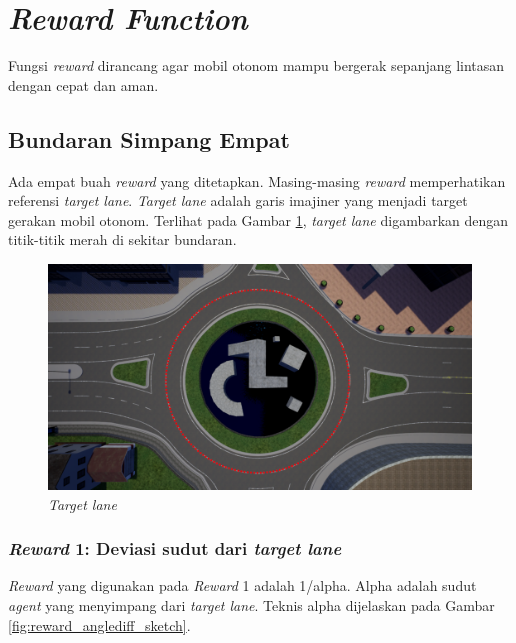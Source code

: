 \section{\textit{Reward Function}}
\label{sec:sistem_reward}

Fungsi \textit{reward} dirancang agar mobil otonom mampu bergerak sepanjang lintasan dengan cepat dan aman.

\subsection{Bundaran Simpang Empat}Ada empat buah \textit{reward} yang ditetapkan. Masing-masing \textit{reward} memperhatikan referensi \textit{target lane}. \textit{Target lane} adalah garis imajiner yang menjadi target gerakan mobil otonom. Terlihat pada Gambar \ref{fig:target_lane_line}, \textit{target lane} digambarkan dengan titik-titik merah di sekitar bundaran.

\begin{figure}[H] 
	\centering
	\includegraphics[width=1\linewidth]{images/target_lane_line}
	\caption{\textit{Target lane}}
	\label{fig:target_lane_line}
\end{figure}

\subsubsection{\textit{Reward} 1: Deviasi sudut dari \textit{target lane}}
\textit{Reward }yang digunakan pada \textit{Reward }1 adalah 1/alpha. Alpha adalah sudut \textit{agent }yang menyimpang dari \textit{target lane}. Teknis alpha dijelaskan pada Gambar \ref{fig:reward_anglediff_sketch}. 

